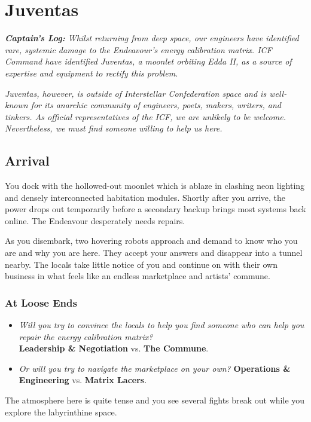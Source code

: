 \documentclass[11pt, a5paper, parskip=half-, DIV=12]{scrartcl}
\begin{document}
\section*{Juventas}
\textit{\textbf{Captain's Log:} Whilst returning from deep space, our engineers have identified rare, systemic damage to the Endeavour’s energy calibration matrix. ICF Command have identified Juventas, a moonlet orbiting Edda II, as a source of expertise and equipment to rectify this problem.}

\textit{ Juventas, however, is outside of Interstellar Confederation space and is well-known for its anarchic community of engineers, poets, makers, writers, and tinkers. As official representatives of the ICF, we are unlikely to be welcome. Nevertheless, we must find someone willing to help us here.}

\subsection*{Arrival}
You dock with the hollowed-out moonlet which is ablaze in clashing neon
lighting and densely interconnected habitation modules. Shortly after you arrive, the power drops out temporarily before a secondary backup brings most systems back online. The Endeavour desperately needs repairs.

As you disembark, two hovering robots approach and demand to know who you are and why you are here. They accept your answers and disappear into a tunnel nearby. The locals take little notice of you and continue on with their own business in what feels like an endless marketplace and artists' commune.

\subsubsection*{At Loose Ends}
\begin{itemize}
	\item \textit{Will you try to convince the locals to help you find someone who can help you repair the energy calibration matrix?} \\ \textbf{Leadership \& Negotiation} vs. \textbf{The Commune}.
	\item \textit{Or will you try to navigate the marketplace on your own?} \textbf{Operations \& Engineering} vs. \textbf{Matrix Lacers}.
\end{itemize}
The atmosphere here is quite tense and you see several fights break out while you explore the labyrinthine space.
\newpage
\end{document}
